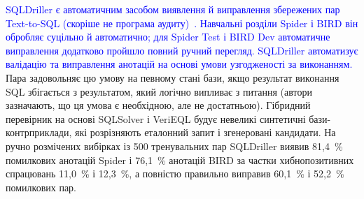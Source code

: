 \documentclass[a4paper,14pt,oneside]{extreport}
\begin{document}
\textcolor{blue}{SQLDriller є автоматичним засобом виявлення й виправлення збережених пар Text-to-SQL (скоріше не програма аудиту)~\cite{yang2025sqldriller}. Навчальні розділи Spider і BIRD він обробляє суцільно й автоматично; для Spider Test і BIRD Dev автоматичне виправлення додатково пройшло повний ручний перегляд. SQLDriller автоматизує валідацію та виправлення анотацій на основі умови узгодженості за виконанням.} Пара задовольняє цю умову на певному стані бази, якщо результат виконання SQL збігається з результатом, який логічно випливає з питання (автори зазначають, що ця умова є необхідною, але не достатньою). Гібридний перевірник на основі SQLSolver і VeriEQL будує невеликі синтетичні бази-контрприклади, які розрізняють еталонний запит і згенеровані кандидати. На ручно розмічених вибірках із 500 тренувальних пар SQLDriller виявив 81,4~\% помилкових анотацій Spider і 76,1~\% анотацій BIRD за частки хибнопозитивних спрацювань 11,0~\% і 12,3~\%, а повністю правильно виправив 60,1~\% і 52,2~\% помилкових пар.
\end{document}
